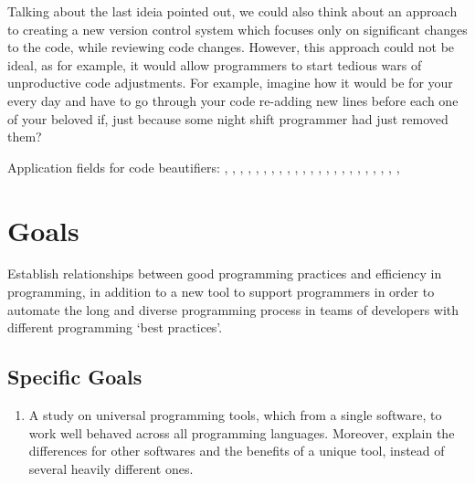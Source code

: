 \begin{englishtext}
    Talking about the last ideia pointed out, we could also think about an
    approach to creating a new version control system which focuses only on
    significant changes to the code, while reviewing code changes. However, this
    approach could not be ideal, as for example, it would allow programmers to
    start tedious wars of unproductive code adjustments. For example, imagine
    how it would be for your every day and have to go through your code
    re-adding new lines before each one of your beloved if\s, just because some
    night shift programmer had just removed them?


    Application fields for code beautifiers:
    ,
    ,
    ,
    ,
    ,
    ,
    ,
    ,
    ,
    ,
    ,
    ,
    ,
    ,
    ,
    ,
    ,
    ,
    ,
    ,
    ,
    ,
    ,

    \section{Goals}

    Establish relationships between good programming practices and efficiency in
    programming, in addition to a new tool to support programmers in order to
    automate the long and diverse programming process in teams of developers
    with different programming `best practices'. \cite{pushdownAutomata}


    \subsection{Specific Goals}

    \begin{enumerate}
        \item A study on universal programming tools, which from a single
        software, to work well behaved across all programming languages.
        Moreover, explain the differences for other softwares and the benefits
        of a unique tool, instead of several heavily different ones.


\end{enumerate}
\end{englishtext}
